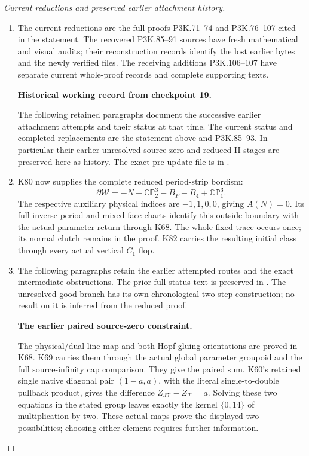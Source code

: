 \begin{proof}[Current reductions and preserved earlier attachment history]
\begin{enumerate}[label=\arabic*.]
\item The current reductions are the full proofs P3K.71--74 and
P3K.76--107 cited in the statement. The recovered P3K.85--91
sources have fresh mathematical and visual audits; their
reconstruction records identify the lost earlier bytes and the
newly verified files. The receiving additions P3K.106--107 have separate current whole-proof records and complete supporting texts.

\par\medskip\noindent\textbf{Historical working record from checkpoint 19.}\par\nopagebreak[4]
The following retained paragraphs document the successive earlier
attachment attempts and their status at that time. The current
status and completed replacements are the statement above and
P3K.85--93. In particular their earlier unresolved source-zero
and reduced-II stages are preserved here as history. The exact
pre-update file is in
.

\item K80 now supplies the complete reduced period-strip bordism:
\[
 \partial\mathcal W=-N-\mathbb {CP}^{3}_{2}-B_F-B_4
                                      +\mathbb {CP}^{3}_{1}.
\]
The respective auxiliary physical indices are \(-1,1,0,0\),
giving \(A(N)=0\). Its full inverse period and mixed-face
charts identify this outside boundary with the actual parameter
return through K68. The whole fixed trace occurs once; its
normal clutch remains in the proof. K82 carries the resulting
initial class through every actual vertical \(C_1\) flop.

\item The following paragraphs retain the earlier attempted routes
and the exact intermediate obstructions. The prior full status
text is preserved in
.
The unresolved good branch has its own chronological two-step
construction; no result on it is inferred from the reduced proof.

\par\medskip\noindent\textbf{The earlier paired source-zero constraint.}\par\nopagebreak[4]
The physical/dual line map and both Hopf-gluing orientations are
proved in K68. K69 carries them through the actual global
parameter groupoid and the full source-infinity cap comparison.
They give the paired sum. K60's retained single native diagonal
pair \((1-a,a)\), with the literal single-to-double pullback
product, gives the difference \(Z_{J\mathcal T}-Z_{\mathcal T}=a\).
Solving these two equations in the stated group leaves exactly
the kernel \(\{0,14\}\) of multiplication by two. These actual
maps prove the displayed two possibilities; choosing either
element requires further information.


\end{enumerate}
\end{proof}
